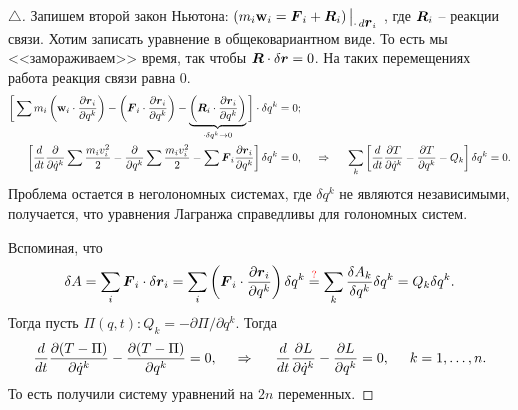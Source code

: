 \begin{proof}[$\triangle$]
Запишем второй закон Ньютона:
$
    \left(
        m_i \mbox{\boldmath $\mathrm{w}$}_i = \mbox{\boldmath $F$}_i + \mbox{\boldmath $R$}_i
    \right)\big|_{\cdot \, d \mbox{\boldmath $r$}_i}
$
, где $\mbox{\boldmath $R$}_i$ -- реакции связи. Хотим записать уравнение в общековариантном виде.
То есть мы <<замораживаем>> время, так чтобы $\mbox{\boldmath $R$} \cdot \delta \mbox{\boldmath $r$} = 0$. На таких перемещениях работа реакция связи равна 0.
\begin{align*}
    \bigg[
        \sum m_i \left(\mbox{\boldmath $\mathrm{w}$}_i \cdot \frac{\partial \mbox{\boldmath $r$}_i}{\partial q^k} \right)
        -
        \left(\mbox{\boldmath $F$}_i \cdot \frac{\partial \mbox{\boldmath $r$}_i}{\partial q^k} \right)
        -
        \underbrace{
        \left(
            \mbox{\boldmath $R$}_i \cdot \frac{\partial \mbox{\boldmath $r$}_i}{\partial q^k} 
        \right)}_{\cdot \delta q^k \to 0}
    \bigg] \cdot \delta q^k &= 0;
    \\
    \left[
        \frac{d}{dt} \frac{\partial }{\partial \dot{q}^k} \sum  \frac{m_i v_i^2}{2} 
        -
        \frac{\partial }{\partial q^k} \sum \frac{m_i v_i^2}{2} -
        \sum \mbox{\boldmath $F$}_i \frac{\partial \mbox{\boldmath $r$}_i}{\partial q^k} 
    \right] \delta q^k &= 0
    , \hspace{0.5cm} \Rightarrow \hspace{0.5cm} 
    \sum_k
    \left[
        \frac{d}{dt} \frac{\partial T}{\partial \dot{q}^k} 
        - \frac{\partial T}{\partial q^k} - Q_k
    \right] \delta q^k = 0.
\end{align*}
Проблема остается в неголономных системах, где $\delta q^k$ не являются независимыми, получается, что уравнения Лагранжа справедливы для голономных систем.

Вспоминая, что
\begin{equation*}
    \delta  A = \sum_i \mbox{\boldmath $F$}_i \cdot \delta \mbox{\boldmath $r$}_i =
    \sum_i \left(\mbox{\boldmath $F$}_i \cdot \frac{\partial \mbox{\boldmath $r$}_i}{\partial q^k}\right) \delta q^k \overset{\text{\textcolor{red}{?}}}{=} 
    \sum_k 
    \frac{\delta A_k}{\delta q^k} \delta q^k = Q_k \delta q^k.
\end{equation*}
Тогда пусть $\Pi (q, t) \colon Q_k = - \partial \Pi / \partial q^k$.  Тогда
\begin{equation*}
    \frac{d}{dt} \frac{\partial (T-\Pi)}{\partial \dot{q}^k} - \frac{\partial (T - \Pi)}{\partial q^k}  = 0,
    \hspace{0.5cm} \Rightarrow \hspace{0.5cm} 
    \frac{d}{dt} \frac{\partial L}{\partial \dot{q}^k} - \frac{\partial L}{\partial q^k} = 0, \hspace{0.5cm} k = 1, \ldots, n.
\end{equation*}
То есть получили систему уравнений на $2n$ переменных.
\end{proof}



